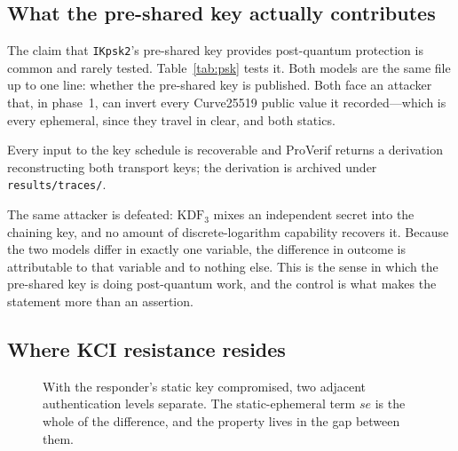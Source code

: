 \subsection{What the pre-shared key actually contributes}

\begin{table}[t]
\centering
\caption{The post-quantum control experiment: two models, one variable. Both
arms face the same attacker, which gains a discrete-logarithm oracle in
phase~1. The verdict column is read from the same result file as
Table~\ref{tab:results}, so the experiment cannot be reported as having
succeeded in a run where it did not.}
\label{tab:psk}
\footnotesize

\end{table}

The claim that \texttt{IKpsk2}'s pre-shared key provides post-quantum
protection is common and rarely tested. Table~\ref{tab:psk} tests it. Both
models are the same file up to one line: whether the pre-shared key is
published. Both face an attacker that, in phase~1, can invert every
Curve25519 public value it recorded---which is every ephemeral, since they
travel in clear, and both statics.

 Every input to the key schedule is recoverable and
ProVerif returns a derivation reconstructing both transport keys; the
derivation is archived under \texttt{results/traces/}.

 The same attacker is defeated:
\(\mathrm{KDF}_3\) mixes an independent secret into the chaining key, and no
amount of discrete-logarithm capability recovers it. Because the two models
differ in exactly one variable, the difference in outcome is attributable to
that variable and to nothing else. This is the sense in which the pre-shared
key is doing post-quantum work, and the control is what makes the statement
more than an assertion.

\subsection{Where KCI resistance resides}

\begin{figure}[t]
\centering
\resizebox{\columnwidth}{!}{}
\caption{With the responder's static key compromised, two adjacent
authentication levels separate. The static-ephemeral term \(se\) is the whole
of the difference, and the property lives in the gap between them.}
\label{fig:kci}
\end{figure}

